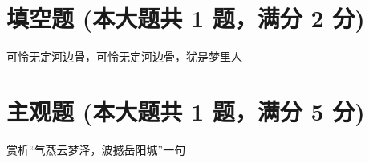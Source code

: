 \documentclass[12pt, a4paper, addpoints]{exam}
\begin{document}
\hspace{5cm}

\section{\normalsize{填空题 (本大题共 1 题，满分 2 分)}}
\hspace{1.5cm}
\begin{questions}
\question[2] 可怜无定河边骨，可怜无定河边骨，犹是\uline{\qquad\qquad\qquad\qquad}梦里人

\end{questions}

\hspace{5cm}

\section{\normalsize{主观题 (本大题共 1 题，满分 5 分)}}
\hspace{1.5cm}
\begin{questions}
\question[5] 赏析“气蒸云梦泽，波撼岳阳城”一句


\end{questions}
\end{document}
